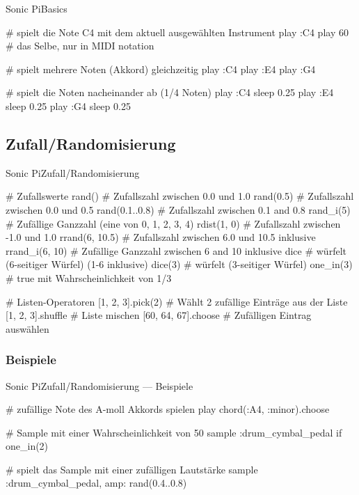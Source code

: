 \documentclass{beamer}
\begin{document}
\begin{frame}[fragile]{Sonic Pi}{Basics}
  \begin{rubycode}

    # spielt die Note C4 mit dem aktuell ausgewählten Instrument
    play :C4
    play 60 # das Selbe, nur in MIDI notation

    # spielt mehrere Noten (Akkord) gleichzeitig
    play :C4
    play :E4
    play :G4

    # spielt die Noten nacheinander ab (1/4 Noten)
    play :C4
    sleep 0.25
    play :E4
    sleep 0.25
    play :G4
    sleep 0.25

  \end{rubycode}
\end{frame}

\subsection{Zufall/Randomisierung}
\begin{frame}[fragile]{Sonic Pi}{Zufall/Randomisierung}
  \begin{rubycode}

    # Zufallswerte
    rand()          # Zufallszahl zwischen 0.0 und 1.0
    rand(0.5)       # Zufallszahl zwischen 0.0 und 0.5
    rand(0.1..0.8)  # Zufallszahl zwischen 0.1 and 0.8
    rand_i(5)       # Zufällige Ganzzahl (eine von 0, 1, 2, 3, 4)
    rdist(1, 0)     # Zufallszahl zwischen -1.0 und 1.0
    rrand(6, 10.5)  # Zufallszahl zwischen 6.0 und 10.5 inklusive
    rrand_i(6, 10)  # Zufällige Ganzzahl zwischen 6 and 10 inklusive
    dice            # würfelt (6-seitiger Würfel) (1-6 inklusive)
    dice(3)         # würfelt (3-seitiger Würfel)
    one_in(3)       # true mit Wahrscheinlichkeit von 1/3

    # Listen-Operatoren
    [1, 2, 3].pick(2)   # Wählt 2 zufällige Einträge aus der Liste
    [1, 2, 3].shuffle   # Liste mischen
    [60, 64, 67].choose # Zufälligen Eintrag auswählen

  \end{rubycode}
\end{frame}

\subsubsection{Beispiele}
\begin{frame}[fragile]{Sonic Pi}{Zufall/Randomisierung --- Beispiele}
  \begin{rubycode}

    # zufällige Note des A-moll Akkords spielen
    play chord(:A4, :minor).choose

    # Sample mit einer Wahrscheinlichkeit von 50%
    sample :drum_cymbal_pedal if one_in(2)

    # spielt das Sample mit einer zufälligen Lautstärke
    sample :drum_cymbal_pedal, amp: rand(0.4..0.8)

  \end{rubycode}
\end{frame}
\end{document}
